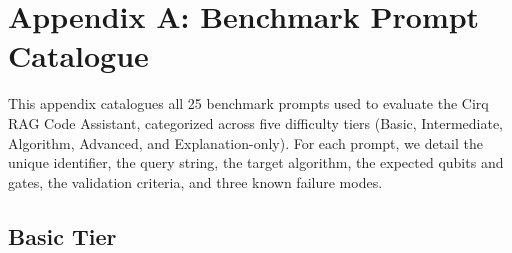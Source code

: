 \section*{Appendix A: Benchmark Prompt Catalogue}
\label{sec:appendix_a}


This appendix catalogues all 25 benchmark prompts used to evaluate the Cirq RAG Code Assistant, categorized across five difficulty tiers (Basic, Intermediate, Algorithm, Advanced, and Explanation-only). For each prompt, we detail the unique identifier, the query string, the target algorithm, the expected qubits and gates, the validation criteria, and three known failure modes.


\subsection*{Basic Tier}

